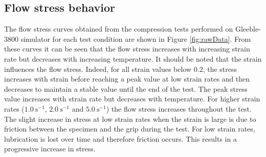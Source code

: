 \documentclass[twoside,english,1p,final,sort&compress]{elsarticle}
\theoremstyle{plain}
\begin{document}
\subsection{Flow stress behavior}
The flow stress curves obtained from the compression tests performed on Gleeble-3800 simulator for each test condition are shown in Figure \ref{fig:rawData}. From these curves it can be seen that the flow stress increases with increasing strain rate but decreases with increasing temperature. It should be noted that the strain influences the flow stress. Indeed, for all strain values below $0.2$, the stress increases with strain before reaching a peak value at low strain rates and then decreases to maintain a stable value until the end of the test. The peak stress value increases with strain rate but decreases with temperature. For higher strain rates ($1.0\ \text{s}^{-1}$, $2.0\ \text{s}^{-1}$ and $5.0\ \text{s}^{-1}$) the flow stress increases throughout the test. The slight increase in stress at low strain rates when the strain is large is due to friction between the specimen and the grip during the test. For low strain rates, lubrication is lost over time and therefore friction occurs. This results in a progressive increase in stress.
\end{document}
